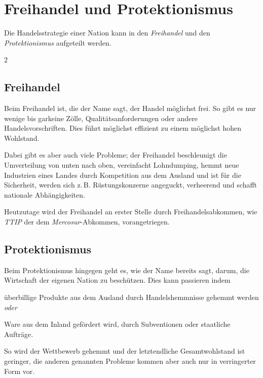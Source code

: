 \documentclass{article}
\begin{document}
\section{Freihandel und Protektionismus}
Die Handelsstrategie einer Nation kann in den \emph{Freihandel} und den \emph{Protektionismus} aufgeteilt werden.
 
\raggedcolumns
\begin{multicols}{2} 
\subsection{Freihandel}
Beim Freihandel ist, die der Name sagt, der Handel möglichst frei. So gibt es nur wenige bis garkeine Zölle, Qualitätsanforderungen oder andere Handelsvorschriften. Dies führt möglichst effizient zu einem möglichst hohen Wohlstand.
 
Dabei gibt es aber auch viele Probleme; der Freihandel beschleunigt die Umverteilung von unten nach oben, vereinfacht Lohndumping, hemmt neue Industrien eines Landes durch Kompetition aus dem Ausland und ist für die Sicherheit, werden sich z.\,B. Rüstungskonzerne angeguckt, verheerend und schafft nationale Abhängigkeiten.
 
Heutzutage wird der Freihandel an erster Stelle durch Freihandelsabkommen, wie \emph{TTIP} der dem \emph{Mercosur}-Abkommen, vorangetriegen. 
 
\columnbreak 
 
\subsection{Protektionismus}
Beim Protektionismus hingegen geht es, wie der Name bereits sagt, darum, die Wirtschaft der eigenen Nation zu beschützen. Dies kann passieren indem
\begin{list}{}{\leftmargin=0cm}
 \item überbillige Produkte aus dem Ausland durch Handelshemmnisse gehemmt werden \emph{oder}
 \item Ware aus dem Inland gefördert wird, durch Subventionen oder staatliche Aufträge.
\end{list}
So wird der Wettbewerb gehemmt und der letztendliche Gesamtwohlstand ist geringer, die anderen genannten Probleme kommen aber auch nur in verringerter Form vor. 
\end{multicols}
 
\end{document}
